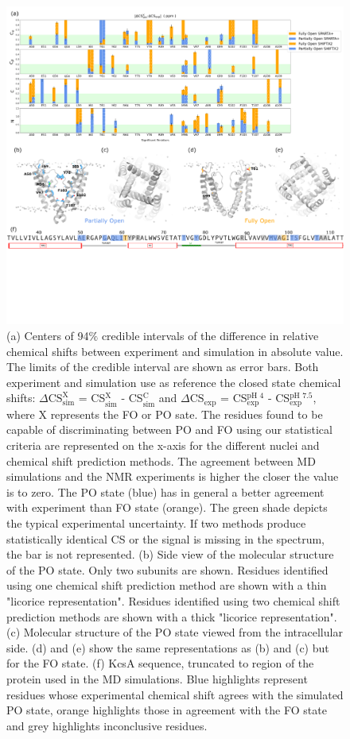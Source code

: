 \documentclass[%
 aip,
 amsmath,amssymb,
 preprint,%
]{revtex4-1}
\begin{document}
\begin{figure}[tbp]
\includegraphics[width=\textwidth, trim={ 0 10cm  0 0},clip]{figures/state_assignment_scheme.pdf}%
\caption{\label{state_assignment_scheme} \scriptsize
    (a) Centers of 94$\%$ credible intervals of the difference in relative chemical shifts between experiment and simulation in absolute value. The limits of the credible interval are shown as error bars. Both experiment and simulation use as reference the closed state chemical shifts: $\Delta\text{CS}_{\text{sim}}^{\text{X}}$ = CS$_{\text{sim}}^{\text{X}}$ - CS$_{\text{sim}}^{\text{C}}$  and $\Delta\text{CS}_{\text{exp}}$ = CS$_{\text{exp}}^{\text{pH }4}$ - CS$_{\text{exp}}^{\text{pH }7.5}$, where X represents the FO or PO sate. The residues found to be capable of discriminating between PO and FO using our statistical criteria are represented on the x-axis for the different nuclei and chemical shift prediction methods. The agreement between MD simulations and the NMR experiments is higher the closer the value is to zero. The PO state (blue) has in general a better agreement with experiment than FO state (orange). The green shade depicts the typical experimental uncertainty. If two methods produce statistically identical CS or the signal is missing in the spectrum, the bar is not represented. (b) Side view of the molecular structure of the PO state. Only two subunits are shown. Residues identified using one chemical shift prediction method are shown with a thin "licorice representation". Residues identified using two chemical shift prediction methods are shown with a thick "licorice representation". (c) Molecular structure of the PO state viewed from the intracellular side. (d) and (e) show the same representations as (b) and (c) but for the FO state.
    (f) KcsA sequence, truncated to region of the protein used in the MD simulations. Blue highlights represent residues whose experimental chemical shift agrees with the simulated PO state, orange highlights those in agreement with the FO state and grey highlights inconclusive residues.} 
\end{figure}
\end{document}

